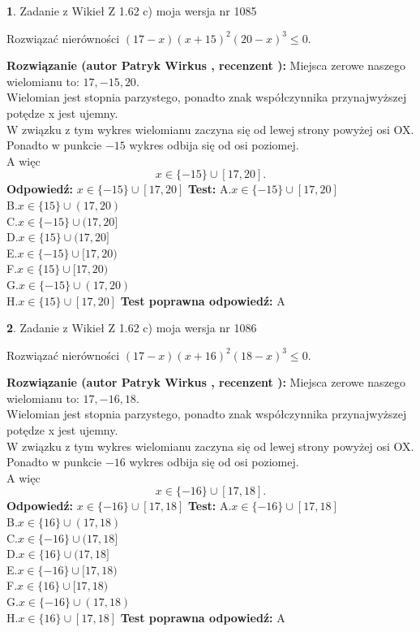 \documentclass[12pt, a4paper]{article}
\theoremstyle{definition} %
\newtheorem{zad}{}
\newcommand{\zadStart}[1]{\begin{zad}#1\newline}
\newcommand{\zadStop}{\end{zad}}
\newcommand{\rozwStart}[2]{\noindent \textbf{Rozwiązanie (autor #1 , recenzent #2): }\newline}
\newcommand{\rozwStop}{\newline}
\newcommand{\odpStart}{\noindent \textbf{Odpowiedź:}\newline}
\newcommand{\odpStop}{\newline}
\newcommand{\testStart}{\noindent \textbf{Test:}\newline}
\newcommand{\testStop}{\newline}
\newcommand{\kluczStart}{\noindent \textbf{Test poprawna odpowiedź:}\newline}
\newcommand{\kluczStop}{\newline}
\begin{document}
\zadStart{Zadanie z Wikieł Z 1.62 c) moja wersja nr 1085}

Rozwiązać nierówności $(17-x)(x+15)^{2}(20-x)^{3}\le0$.
\zadStop
\rozwStart{Patryk Wirkus}{}
Miejsca zerowe naszego wielomianu to: $17, -15, 20$.\\
Wielomian jest stopnia parzystego, ponadto znak współczynnika przy\linebreak najwyższej potędze x jest ujemny.\\ W związku z tym wykres wielomianu zaczyna się od lewej strony powyżej osi OX.\\
Ponadto w punkcie $-15$ wykres odbija się od osi poziomej.\\
A więc $$x \in \{-15\} \cup [17,20].$$
\rozwStop
\odpStart
$x \in \{-15\} \cup [17,20]$
\odpStop
\testStart
A.$x \in \{-15\} \cup [17,20]$\\
B.$x \in \{15\} \cup (17,20)$\\
C.$x \in \{-15\} \cup (17,20]$\\
D.$x \in \{15\} \cup (17,20]$\\
E.$x \in \{-15\} \cup [17,20)$\\
F.$x \in \{15\} \cup [17,20)$\\
G.$x \in \{-15\} \cup (17,20)$\\
H.$x \in \{15\} \cup [17,20]$
\testStop
\kluczStart
A
\kluczStop



\zadStart{Zadanie z Wikieł Z 1.62 c) moja wersja nr 1086}

Rozwiązać nierówności $(17-x)(x+16)^{2}(18-x)^{3}\le0$.
\zadStop
\rozwStart{Patryk Wirkus}{}
Miejsca zerowe naszego wielomianu to: $17, -16, 18$.\\
Wielomian jest stopnia parzystego, ponadto znak współczynnika przy\linebreak najwyższej potędze x jest ujemny.\\ W związku z tym wykres wielomianu zaczyna się od lewej strony powyżej osi OX.\\
Ponadto w punkcie $-16$ wykres odbija się od osi poziomej.\\
A więc $$x \in \{-16\} \cup [17,18].$$
\rozwStop
\odpStart
$x \in \{-16\} \cup [17,18]$
\odpStop
\testStart
A.$x \in \{-16\} \cup [17,18]$\\
B.$x \in \{16\} \cup (17,18)$\\
C.$x \in \{-16\} \cup (17,18]$\\
D.$x \in \{16\} \cup (17,18]$\\
E.$x \in \{-16\} \cup [17,18)$\\
F.$x \in \{16\} \cup [17,18)$\\
G.$x \in \{-16\} \cup (17,18)$\\
H.$x \in \{16\} \cup [17,18]$
\testStop
\kluczStart
A
\kluczStop
\end{document}
